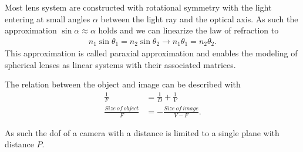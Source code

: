 Most lens system are constructed with rotational symmetry with the light entering at small angles $\alpha$ between the light ray and the optical axis.
As such the approximation $\sin  \alpha \approx \alpha$ holds and we can linearize the law of refraction to
\begin{align}
    n_1 \sin \theta_1 = n_2 \sin \theta_2 \rightarrow n_1 \theta_1 = n_2 \theta_2.
\end{align}
This approximation is called paraxial approximation and enables the modeling of spherical lenses as linear systems with their associated matrices. \cite{Beyerer.2016}

The relation between the object and image can be described with
\begin{align}
    \frac{1}{F} &= \frac{1}{D} + \frac{1}{V} \\
    \frac{Size\:of\:object}{F} &= -\frac{Size\:of\:image}{V-F}.
    \label{eq:sharp-thin-lens}
\end{align}

As such the \gls{dof} of a camera with a distance is limited to a single plane with distance $P$.

